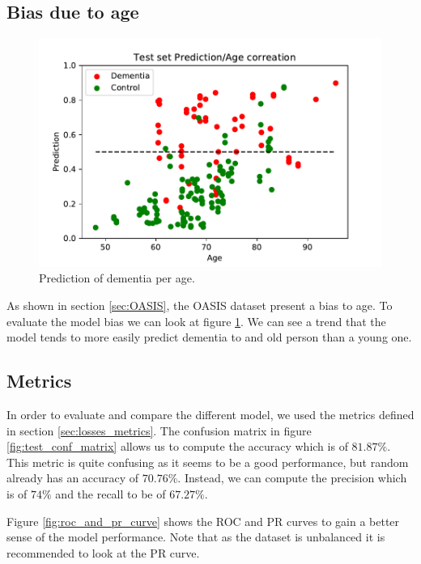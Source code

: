\subsection{Bias due to age}
\begin{figure}
 \centering
 \includegraphics[width=.9\linewidth]{figures/Experiements/Eval/prediction_age.pdf}
 \captionsetup{width=.9\linewidth}
 \caption[PredPerAge]{Prediction of dementia per age.}
 \label{fig:prediction_per_age}
\end{figure}
As shown in section \ref{sec:OASIS}, the OASIS dataset present a bias to age. To evaluate the model bias we can look at figure \ref{fig:prediction_per_age}. We can see a trend that the model tends to more easily predict dementia to and old person than a young one.


\subsection{Metrics}
In order to evaluate and compare the different model, we used the metrics defined in section \ref{sec:losses_metrics}. The confusion matrix in figure \ref{fig:test_conf_matrix} allows us to compute the accuracy which is of $81.87\%$. This metric is quite confusing as it seems to be a good performance, but random already has an accuracy of $70.76\%$. Instead, we can compute the precision which is of $74\%$ and the recall to be of $67.27\%$.

Figure \ref{fig:roc_and_pr_curve} shows the ROC and PR curves to gain a better sense of the model performance. Note that as the dataset is unbalanced it is recommended to look at the PR curve. 


